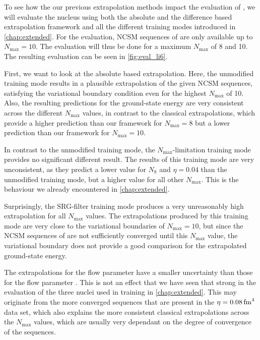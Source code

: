 To see how the our previous extrapolation methods impact the evaluation of , we will evaluate the nucleus using both the absolute and the difference based extrapolation framework and all the different training modes introduced in \autoref{chap:extended}. For the evaluation, NCSM sequences of  are only available up to $N_\mathrm{max} = 10$. The evaluation will thus be done for a maximum $N_\mathrm{max}$ of 8 and 10. The resulting evaluation can be seen in \autoref{fig:eval_li6}.

First, we want to look at the absolute based extrapolation. Here, the unmodified training mode results in a plausible extrapolation of the given NCSM sequences, satisfying the variational boundary condition even for the highest $N_\mathrm{max}$ of 10. Also, the resulting predictions for the ground-state energy are very consistent across the different $N_\mathrm{max}$ values, in contrast to the classical extrapolations, which provide a higher prediction than our framework for $N_\mathrm{max} = 8$ but a lower prediction than our framework for $N_\mathrm{max} = 10$.

In contrast to the unmodified training mode, the $N_\mathrm{max}$-limitation training mode provides no significant different result. The results of this training mode are very unconsistent, as they predict a lower value for $N_\mathrm{8}$ and $\eta = 0.04$ than the unmodified training mode, but a higher value for all other $N_\mathrm{max}$. This is the behaviour we already encountered in \autoref{chap:extended}.

Surprisingly, the SRG-filter training mode produces a very unreasonably high extrapolation for all $N_\mathrm{max}$ values. The extrapolations produced by this training mode are very close to the variational boundaries of $N_\mathrm{max} = 10$, but since the NCSM sequences of  are not sufficiently converged until this $N_\mathrm{max}$ value, the variational boundary does not provide a good comparison for the extrapolated ground-state energy.

The extrapolations for the flow parameter  have a smaller uncertainty than those for the flow parameter . This is not an effect that we have seen that strong in the evaluation of the three nuclei used in training in \autoref{chap:extended}. This may originate from the more converged sequences that are present in the $\eta = \srg{0.08}$ data set, which also explains the more consistent classical extrapolations across the $N_\mathrm{max}$ values, which are usually very dependant on the degree of convergence of the sequences.

